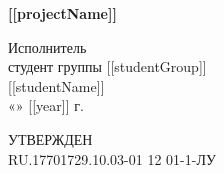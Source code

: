 \documentclass[12pt]{article}
\begin{document}
\begin{center}
    \textbf{[[projectName]]}
\end{center}
\begin{center}
    \textbf{\fontsize{14pt}{14pt}\selectfont{Текст программы}}
\end{center}
\begin{center}
    \textbf{\fontsize{14pt}{14pt}\selectfont{ЛИСТ УТВЕРЖДЕНИЯ}}
\end{center}
\begin{center}
    \textbf{\fontsize{14pt}{14pt}\selectfont{RU.17701729.10.03-01 12 01-1-ЛУ}}
\end{center}

\vspace*{\fill}
\begin{minipage}{\textwidth}
    \begin{multicols*}{2}{
    \begin{center}
    \end{center}
    \columnbreak
    \begin{center}{
        Исполнитель \\ 
        студент группы [[studentGroup]] \\
        \underline{\hspace{3cm}} [[studentName]] \\
        «\underline{\hspace{0.5cm}}»\underline{\hspace{2cm}} [[year]] г.
    }\end{center}
}
\end{multicols*}
\end{minipage}

\vspace*{\fill}
\begin{center}
    \textbf{\fontsize{14pt}{14pt}\selectfont{Москва [[year]]}}
\end{center}

\newpage
\thispagestyle{empty}
\begin{minipage}{0.5\textwidth}
\begin{center}
        УТВЕРЖДЕН \\
RU.17701729.10.03-01 12 01-1-ЛУ
\end{center}
\end{minipage}
\end{document}
